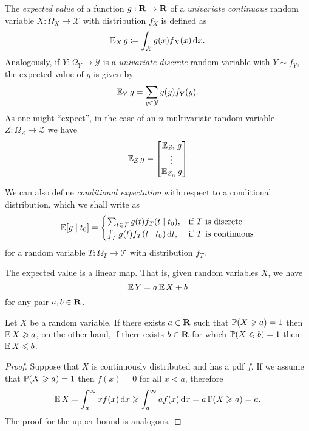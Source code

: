 \begin{definition}
\label{def:expected-value}
The \emph{expected value} of a function \(g: \mathbf{R} \to \mathbf{R}\) of a \emph{univariate
  continuous} random variable \(X: \Omega_X \to \mathcal{X}\) with distribution
\(f_X\) is defined as
\[
\operatorname{\mathbb{E}}_X g \coloneq \int_{\mathcal{X}} g(x) f_X(x)\, \mathrm{d} x.
\]
Analogously, if \(Y: \Omega_Y \to \mathcal{Y}\) is a \emph{univariate discrete}
random variable with \(Y \sim f_Y\), the expected value of \(g\) is given by
\[
\operatorname{\mathbb{E}}_Y g = \sum_{y \in \mathcal{Y}} g(y) f_Y(y).
\]
As one might ``expect'', in the case of an \(n\)-multivariate random variable
\(Z: \Omega_Z \to \mathcal{Z}\) we have
\[
\operatorname{\mathbb{E}}_Z g =
\begin{bmatrix}
  \operatorname{\mathbb{E}}_{Z_1} g \\
  \vdots \\
  \operatorname{\mathbb{E}}_{Z_n} g
\end{bmatrix}
\]

We can also define \emph{conditional expectation} with respect to a conditional
distribution, which we shall write as
\[
\operatorname{\mathbb{E}}[g \mid t_0] =
\begin{cases}
  \sum_{t \in \mathcal{T}} g(t) f_T(t \mid t_0), &\text{if } T \text{ is discrete}\\
  \int_{\mathcal{T}} g(t) f_T(t \mid t_0)\, \mathrm{d} t, &\text{if } T \text{ is continuous}
\end{cases}
\]
for a random variable \(T: \Omega_T \to \mathcal{T}\) with distribution \(f_T\).
\end{definition}

\begin{corollary}
\label{cor:expected-value-is-linear}
The expected value is a linear map. That is, given random variables \(X\), we
have
\[
\operatorname{\mathbb{E}} Y = a \operatorname{\mathbb{E}} X + b
\]
for any pair \(a, b \in \mathbf{R}\).
\end{corollary}

\begin{proposition}
\label{prop:bound-expectation}
Let \(X\) be a random variable. If there exists \(a \in \mathbf{R}\) such that \(\operatorname{\mathbb{P}}(X \geqslant
a) = 1\) then \(\operatorname{\mathbb{E}} X \geqslant a\), on the other hand, if there exists \(b \in \mathbf{R}\)
for which \(\operatorname{\mathbb{P}}(X \leqslant b) = 1\) then \(\operatorname{\mathbb{E}} X \leqslant b\).
\end{proposition}

\begin{proof}
Suppose that \(X\) is continuously distributed and has a pdf \(f\). If we assume
that \(\operatorname{\mathbb{P}}(X \geqslant a) = 1\) then \(f(x) = 0\) for all \(x < a\), therefore
\[
\operatorname{\mathbb{E}} X = \int_a^{\infty} x f(x)\, \mathrm{d} x
\geqslant \int_a^{\infty} a f(x)\, \mathrm{d} x
= a \operatorname{\mathbb{P}}(X \geqslant a) = a.
\]
The proof for the upper bound is analogous.
\end{proof}


